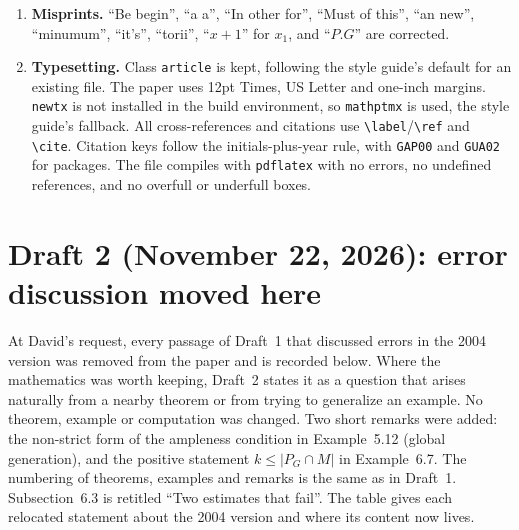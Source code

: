 \documentclass[12pt,letterpaper]{article}
\begin{document}
\begin{enumerate}[leftmargin=*]
results (Proposition~8.1), computational results (Example~8.2, the
resolution of the principal fan), and unverified observations (Remarks
2026.3--2026.6, Question~8.3).
\item \textbf{Misprints.} ``Be begin'', ``a a'', ``In other for'', ``Must of
this'', ``an new'', ``minumum'', ``it's'', ``torii'', ``$x+1$'' for $x_1$, and
``$P.G$'' are corrected.
\item \textbf{Typesetting.} Class \texttt{article} is kept, following the
style guide's default for an existing file. The paper uses 12pt Times, US
Letter and one-inch margins. \texttt{newtx} is not installed in the build
environment, so \texttt{mathptmx} is used, the style guide's fallback. All
cross-references and citations use \verb|\label|/\verb|\ref| and \verb|\cite|.
Citation keys follow the initials-plus-year rule, with \texttt{GAP00} and
\texttt{GUA02} for packages. The file compiles with \texttt{pdflatex} with no
errors, no undefined references, and no overfull or underfull boxes.
\end{enumerate}

\section{Draft 2 (November 22, 2026): error discussion moved here}\label{sec:draft2}

At David's request, every passage of Draft~1 that discussed errors in the
2004 version was removed from the paper and is recorded below. Where the
mathematics was worth keeping, Draft~2 states it as a question that arises
naturally from a nearby theorem or from trying to generalize an example. No
theorem, example or computation was changed. Two short remarks were added:
the non-strict form of the ampleness condition in Example~5.12 (global
generation), and the positive statement $k\le|P_G\cap M|$ in Example~6.7. The
numbering of theorems, examples and
remarks is the same as in Draft~1. Subsection~6.3 is retitled ``Two estimates
that fail''. The table gives each relocated statement about the 2004 version
and where its content now lives.
\end{document}
